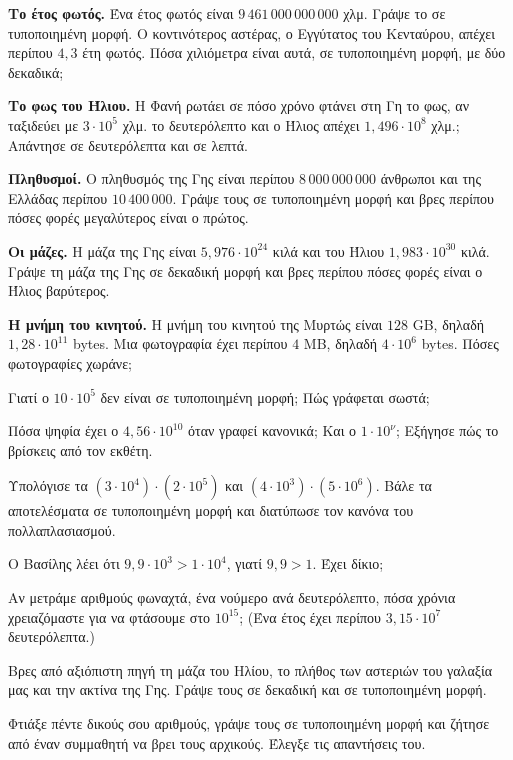 \ex \textbf{Το έτος φωτός.} Ένα έτος φωτός είναι $9\,461\,000\,000\,000$ χλμ. Γράψε το σε τυποποιημένη μορφή. Ο κοντινότερος αστέρας, ο Εγγύτατος του Κενταύρου, απέχει περίπου $4{,}3$ έτη φωτός. Πόσα χιλιόμετρα είναι αυτά, σε τυποποιημένη μορφή, με δύο δεκαδικά;

\ex \textbf{Το φως του Ήλιου.} Η Φανή ρωτάει σε πόσο χρόνο φτάνει στη Γη το φως, αν ταξιδεύει με $3\cdot10^5$ χλμ. το δευτερόλεπτο και ο Ήλιος απέχει $1{,}496\cdot10^8$ χλμ.; Απάντησε σε δευτερόλεπτα και σε λεπτά.

\ex \textbf{Πληθυσμοί.} Ο πληθυσμός της Γης είναι περίπου $8\,000\,000\,000$ άνθρωποι και της Ελλάδας περίπου $10\,400\,000$. Γράψε τους σε τυποποιημένη μορφή και βρες περίπου πόσες φορές μεγαλύτερος είναι ο πρώτος.

\ex \textbf{Οι μάζες.} Η μάζα της Γης είναι $5{,}976\cdot10^{24}$ κιλά και του Ήλιου $1{,}983\cdot10^{30}$ κιλά. Γράψε τη μάζα της Γης σε δεκαδική μορφή και βρες περίπου πόσες φορές είναι ο Ήλιος βαρύτερος.

\ex \textbf{Η μνήμη του κινητού.} Η μνήμη του κινητού της Μυρτώς είναι $128$ GB, δηλαδή $1{,}28\cdot10^{11}$ bytes. Μια φωτογραφία έχει περίπου $4$ MB, δηλαδή $4\cdot10^6$ bytes. Πόσες φωτογραφίες χωράνε;


\ex Γιατί ο $10\cdot10^5$ δεν είναι σε τυποποιημένη μορφή; Πώς γράφεται σωστά;

\ex Πόσα ψηφία έχει ο $4{,}56\cdot10^{10}$ όταν γραφεί κανονικά; Και ο $1\cdot10^{\nu}$; Εξήγησε πώς το βρίσκεις από τον εκθέτη.

\ex Υπολόγισε τα $(3\cdot10^4)\cdot(2\cdot10^5)$ και $(4\cdot10^3)\cdot(5\cdot10^6)$. Βάλε τα αποτελέσματα σε τυποποιημένη μορφή και διατύπωσε τον κανόνα του πολλαπλασιασμού.

\ex Ο Βασίλης λέει ότι $9{,}9\cdot10^3>1\cdot10^4$, γιατί $9{,}9>1$. Έχει δίκιο;

\ex Αν μετράμε αριθμούς φωναχτά, ένα νούμερο ανά δευτερόλεπτο, πόσα χρόνια χρειαζόμαστε για να φτάσουμε στο $10^{15}$; (Ένα έτος έχει περίπου $3{,}15\cdot10^7$ δευτερόλεπτα.)


\ex Βρες από αξιόπιστη πηγή τη μάζα του Ηλίου, το πλήθος των αστεριών του γαλαξία μας και την ακτίνα της Γης. Γράψε τους σε δεκαδική και σε τυποποιημένη μορφή.

\ex Φτιάξε πέντε δικούς σου αριθμούς, γράψε τους σε τυποποιημένη μορφή και ζήτησε από έναν συμμαθητή να βρει τους αρχικούς. Έλεγξε τις απαντήσεις του.
